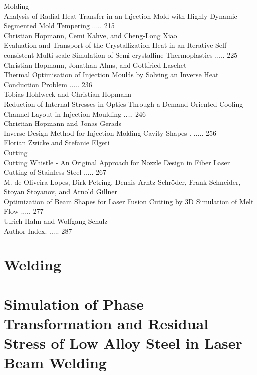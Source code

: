 \documentclass[10pt]{article}
\begin{document}
Molding\\
Analysis of Radial Heat Transfer in an Injection Mold with Highly Dynamic Segmented Mold Tempering ..... 215\\
Christian Hopmann, Cemi Kahve, and Cheng-Long Xiao\\
Evaluation and Transport of the Crystallization Heat in an Iterative Self-consistent Multi-scale Simulation of Semi-crystalline Thermoplastics ..... 225\\
Christian Hopmann, Jonathan Alms, and Gottfried Laschet\\
Thermal Optimisation of Injection Moulds by Solving an Inverse Heat Conduction Problem ..... 236\\
Tobias Hohlweck and Christian Hopmann\\
Reduction of Internal Stresses in Optics Through a Demand-Oriented Cooling Channel Layout in Injection Moulding ..... 246\\
Christian Hopmann and Jonas Gerads\\
Inverse Design Method for Injection Molding Cavity Shapes . ..... 256\\
Florian Zwicke and Stefanie Elgeti\\
Cutting\\
Cutting Whistle - An Original Approach for Nozzle Design in Fiber Laser Cutting of Stainless Steel ..... 267\\
M. de Oliveira Lopes, Dirk Petring, Dennis Arntz-Schröder, Frank Schneider, Stoyan Stoyanov, and Arnold Gillner\\
Optimization of Beam Shapes for Laser Fusion Cutting by 3D Simulation of Melt Flow ..... 277\\
Ulrich Halm and Wolfgang Schulz\\
Author Index. ..... 287

\section*{Welding}
\section*{Simulation of Phase Transformation and Residual Stress of Low Alloy Steel in Laser Beam Welding }
\end{document}
